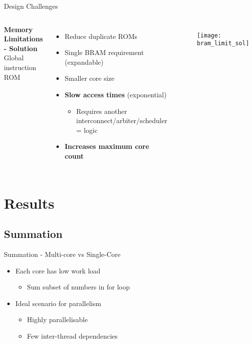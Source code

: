 \documentclass[aspectratio=169]{beamer}
\newcommand\pro{\item[$+$]}
\newcommand\con{\item[$-$]}
\begin{document}
\begin{frame}[fragile,t]{Design Challenges}
\begin{columns}[t]
\textbf{Memory Limitations - Solution}\\
\vspace{0.5cm}
Global instruction ROM
\begin{itemize}
    \pro Reduce duplicate ROMs
    \pro Single BRAM requirement (expandable)
    \pro Smaller core size
    \con \textbf{Slow access times} (exponential)
    \begin{itemize}
        \con Requires another interconnect/arbiter/scheduler = logic
    \end{itemize}
    \pro \textbf{Increases maximum core count}
\end{itemize}
\begin{figure}
    \centering
    \texttt{[image: bram\_limit\_sol]}
\end{figure}
\end{columns}
\end{frame}

\section{Results}
\frame{\tableofcontents[currentsection, subsectionstyle=show/show/hide]}

\subsection{Summation}
\begin{frame}{Summation - Multi-core vs Single-Core}
\begin{itemize}\setlength{\itemsep 2em}
    \item Each core has low work load
        \begin{itemize}
            \item Sum subset of numbers in for loop
        \end{itemize}
    \item Ideal scenario for parallelism
    \begin{itemize}
        \item Highly parallelisable
        \item Few inter-thread dependencies
    \end{itemize}
\end{itemize}
\end{frame}
\end{document}
